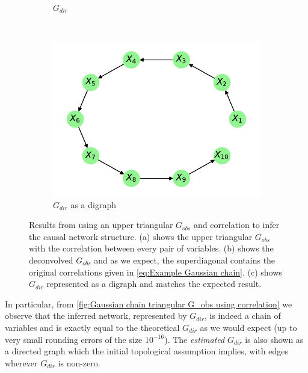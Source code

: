 \documentclass[../Thesis.tex]{subfiles}
\begin{document}
\begin{figure}[H]
\begin{subfigure}[t]{0.49\textwidth}
        \caption{$G_{dir}$}
        \label{subfig:Gaussian chain triangular G_obs using correlation - G_dir}
    \end{subfigure}
    \\[\baselineskip]
    \begin{subfigure}[t]{0.49\textwidth}
        \centering
        \includegraphics[width=.9\linewidth]{figures/Gaussian Chain Theoretical/Chain graph from triangular G obs.pdf}
        \caption{$G_{dir}$ as a digraph}
    \end{subfigure}
    \caption{Results from using an upper triangular $G_{obs}$ and correlation to infer the causal network structure. (a) shows the upper triangular $G_{obs}$ with the correlation between every pair of variables. (b) shows the deconvolved $G_{obs}$ and as we expect, the superdiagonal contains the original correlations given in \autoref{eq:Example Gaussian chain}. (c) shows $G_{dir}$ represented as a digraph and matches the expected result.}
    \label{fig:Gaussian chain triangular G_obs using correlation}
\end{figure}
In particular, from \autoref{fig:Gaussian chain triangular G_obs using correlation} we observe that the inferred network, represented by $G_{dir}$, is indeed a chain of variables and is exactly equal to the theoretical $G_{dir}$ as we would expect (up to very small rounding errors of the size $10^{-16}$). The \textit{estimated} $G_{dir}$ is also shown as a directed graph which the initial topological assumption implies, with edges wherever $G_{dir}$ is non-zero.
\end{document}

